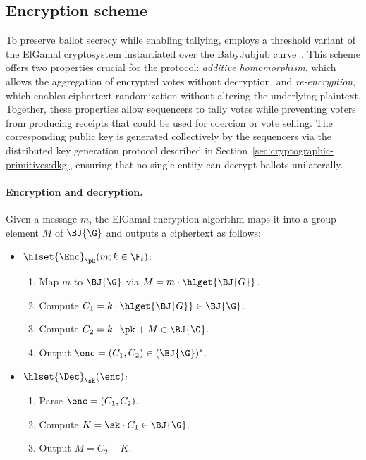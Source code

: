 \subsection{Encryption scheme}
\label{sec:cryptographic-primitives:encryption}

To preserve ballot secrecy while enabling tallying, \davinci employs a threshold variant of the ElGamal cryptosystem instantiated over the BabyJubjub curve~\cite{sutikno1998implementation}. This scheme offers two properties crucial for the protocol: \emph{additive homomorphism}, which allows the aggregation of encrypted votes without decryption, and \emph{re-encryption}, which enables ciphertext randomization without altering the underlying plaintext. Together, these properties allow sequencers to tally votes while preventing voters from producing receipts that could be used for coercion or vote selling. The corresponding public key is generated collectively by the sequencers via the distributed key generation protocol described in Section~\ref{sec:cryptographic-primitives:dkg}, ensuring that no single entity can decrypt ballots unilaterally.

\paragraph{Encryption and decryption.}
Given a message $m$, the ElGamal encryption algorithm maps it into a group element $M$ of $\BJ{\G}$ and outputs a ciphertext as follows:
%
\begin{mdframed}
	\begin{minipage}[t]{0.54\textwidth}
		\begin{itemize}
			\item[$\bullet$] $\hlset{\Enc}_{\pk}(m; k \in \F_t)$:
			\begin{enumerate}
				\item Map $m$ to $\BJ{\G}$ via $M = m \cdot \hlget{\BJ{G}}$.
				\item Compute $C_1 = k \cdot \hlget{\BJ{G}} \in \BJ{\G}$.
				\item Compute $C_2 = k \cdot \pk + M \in \BJ{\G}$.
				\item Output $\enc = (C_1, C_2) \in {(\BJ{\G})}^2$.
			\end{enumerate}
		\end{itemize}
	\end{minipage}
	\begin{minipage}[t]{0.44\textwidth}
		\begin{itemize}
			\item[$\bullet$] $\hlset{\Dec}_{\sk}(\enc)$:
			\begin{enumerate}
				\item Parse $\enc = (C_1, C_2)$.
				\item Compute $K = \sk \cdot C_1 \in \BJ{\G}$.
				\item Output $M = C_2 - K$.
			\end{enumerate}
		\end{itemize}
	\end{minipage}
\end{mdframed}

